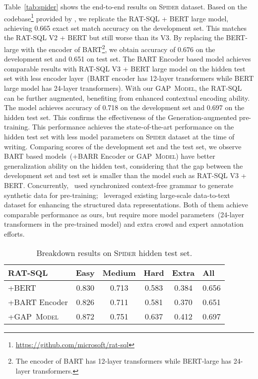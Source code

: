 \documentclass[letterpaper]{article} \usepackage{aaai21}  \usepackage{times}  \usepackage{helvet} \usepackage{courier}  \usepackage[hyphens]{url}  \usepackage{graphicx} \usepackage{booktabs}
\newcommand{\modelnamelm}{\textsc{GAP~Model}}
\begin{document}
Table~\ref{tab:spider} shows the end-to-end results on \textsc{Spider} dataset.
Based on the codebase\footnote{\url{https://github.com/microsoft/rat-sql}} provided by \citet{wang2019rat}, we replicate the RAT-SQL + BERT large model, achieving 0.665 exact set match accuracy on the development set.
This matches the RAT-SQL V2 + BERT but still worse than its V3.
By replacing the BERT-large with the encoder of BART\footnote{The encoder of BART has 12-layer transformers while BERT-large has 24-layer transformers.}, we obtain accuracy of 0.676 on the development set and 0.651 on test set.
The BART Encoder based model achieves comparable results with RAT-SQL V3 + BERT large model on the hidden test set with less encoder layer~(BART encoder has 12-layer transformers while BERT large model has 24-layer transformers).
With our \modelnamelm, the RAT-SQL can be further augmented, benefiting from enhanced contextual encoding ability.
The model achieves accuracy of 0.718 on the development set and 0.697 on the hidden test set.
This confirms the effectiveness of the Generation-augmented pre-training.
This performance achieves the state-of-the-art performance on the hidden test set with less model parameters on \textsc{Spider} dataset at the time of writing.
Comparing scores of the development set and the test set, we observe BART based models~(+BARR Encoder or \modelnamelm) have better generalization ability on the hidden test, considering that the gap between the development set and test set is smaller than the model such as RAT-SQL V3 + BERT.
Concurrently,~\citet{yu2020grappa} used synchronized context-free grammar to generate synthetic data for pre-training;~\citet{deng2020structure} leveraged existing large-scale data-to-text dataset for enhancing the structured data representations. Both of them achieve comparable performance as ours, but require more model parameters~(24-layer transformers in the pre-trained model) and extra crowd and expert annotation efforts.

\begin{table}[t]
  \centering
  \small
    \begin{tabular}{lccccc}
    \toprule
    RAT-SQL & \multicolumn{1}{l}{Easy} & \multicolumn{1}{l}{Medium} & \multicolumn{1}{l}{Hard} & \multicolumn{1}{l}{Extra} & \multicolumn{1}{l}{All} \\
    \midrule
     +BERT & 0.830 & 0.713 & 0.583 & 0.384 & 0.656 \\
     +BART Encoder & 0.826 & 0.711 & 0.581 & 0.370 & 0.651 \\
     +\modelnamelm & 0.872 & 0.751 & 0.637 & 0.412 & 0.697 \\
    \bottomrule
    \end{tabular}\caption{Breakdown results on \textsc{Spider} hidden test set.} 
  \label{tab:breakdown}\end{table}
\end{document}
